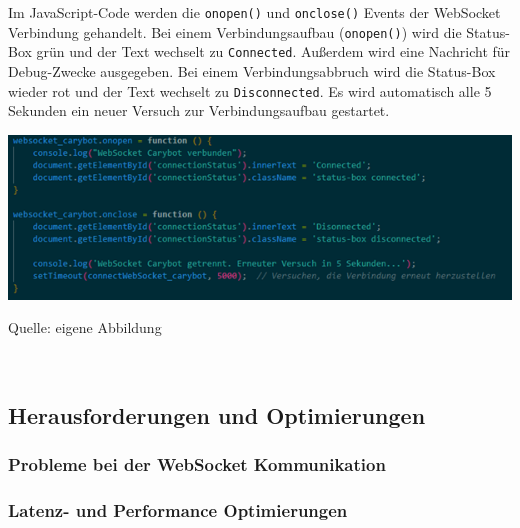 \documentclass[ngerman,12pt,a4paper]{article}
\begin{document}
	Im JavaScript-Code werden die \texttt{onopen()} und \texttt{onclose()} Events der WebSocket Verbindung gehandelt. Bei einem Verbindungsaufbau (\texttt{onopen()}) wird die Status-Box grün und der Text wechselt zu \texttt{Connected}. Außerdem wird eine Nachricht für Debug-Zwecke ausgegeben. Bei einem Verbindungsabbruch wird die Status-Box wieder rot und der Text wechselt zu \texttt{Disconnected}. Es wird automatisch alle 5 Sekunden ein neuer Versuch zur Verbindungsaufbau gestartet.
	\begin{center}
		\begin{minipage}[t]{0.95\textwidth}
			\includegraphics[scale=0.9]{Pictures/status-js}
			\label{fig:status-js}
			\vspace{-10pt}
			\begin{center}
				\par\small Quelle: eigene Abbildung 
			\end{center}
		\end{minipage} \\[0.75cm]
	\end{center}
			
		\subsection{Herausforderungen und Optimierungen}
		
			\subsubsection{Probleme bei der WebSocket Kommunikation}
			
			\subsubsection{Latenz- und Performance Optimierungen}
			
\end{document}
